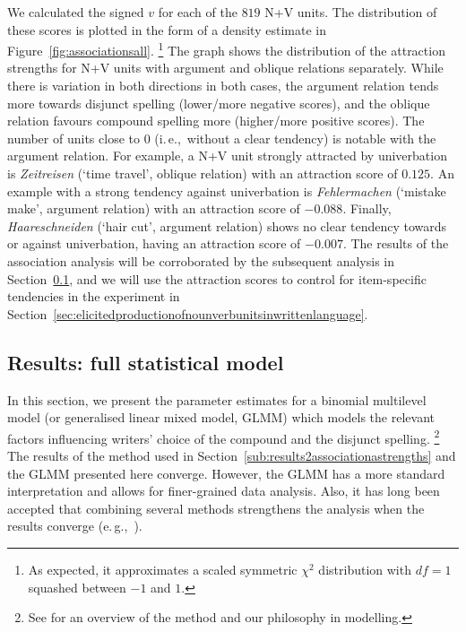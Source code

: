 \documentclass[biblatex, charis, linguex]{glossa}\usepackage{knitr}
\newcommand{\ie}{i.\,e.,\ }
\newcommand{\egg}{e.\,g.,\ }
\begin{document}
We calculated the signed $v$ for each of the $819$ N+V units.
The distribution of these scores is plotted in the form of a density estimate in Figure~\ref{fig:associationsall}.%
\footnote{As expected, it approximates a scaled symmetric $\chi^2$ distribution with $df=1$ squashed between $-1$ and $1$.}
The graph shows the distribution of the attraction strengths for N+V units with argument and oblique relations separately.
While there is variation in both directions in both cases, the argument relation tends more towards disjunct spelling (lower\slash more negative scores), and the oblique relation favours compound spelling more (higher\slash more positive scores).
The number of units close to $0$ (\ie without a clear tendency) is notable with the argument relation.
For example, a N+V unit strongly attracted by univerbation is \textit{Zeitreisen} (`time travel', oblique relation) with an attraction score of $0.125$.
An example with a strong tendency against univerbation is \textit{Fehlermachen} (`mistake make', argument relation) with an attraction score of $-0.088$.
Finally, \textit{Haareschneiden} (`hair cut', argument relation) shows no clear tendency towards or against univerbation, having an attraction score of $-0.007$.
The results of the association analysis will be corroborated by the subsequent analysis in Section~\ref{sub:results1multilevelmodel}, and we will use the attraction scores to control for item-specific tendencies in the experiment in Section~\ref{sec:elicitedproductionofnounverbunitsinwrittenlanguage}.

\subsection{Results: full statistical model}
\label{sub:results1multilevelmodel}

In this section, we present the parameter estimates for a binomial multilevel model (or generalised linear mixed model, GLMM) which models the relevant factors influencing writers' choice of the compound and the disjunct spelling.%
\footnote{See \citet{Schaefer2020a} for an overview of the method and our philosophy in modelling.}
The results of the method used in Section~\ref{sub:results2associationastrengths} and the GLMM presented here converge.
However, the GLMM has a more standard interpretation and allows for finer-grained data analysis.
Also, it has long been accepted that combining several methods strengthens the analysis when the results converge (\egg \citealt{ArppeJaervikivi2007}).
\end{document}
